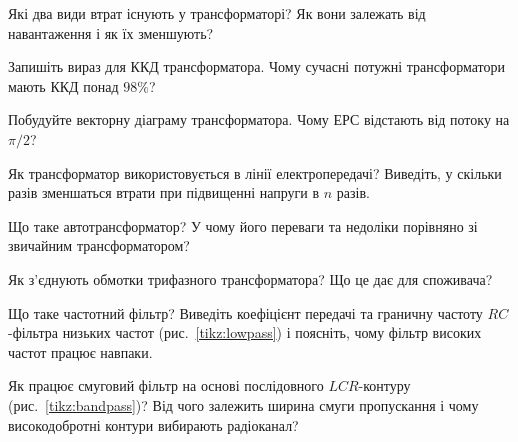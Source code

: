 \begin{Questions}
\begin{quizlist}
	\item Які два види втрат існують у трансформаторі? Як вони залежать від навантаження і як їх зменшують?
	\item Запишіть вираз для ККД трансформатора. Чому сучасні потужні трансформатори мають ККД понад $98\%$?
	\item Побудуйте векторну діаграму трансформатора. Чому ЕРС відстають від потоку на $\pi/2$?
	\item Як трансформатор використовується в лінії електропередачі? Виведіть, у скільки разів зменшаться втрати при підвищенні напруги в $n$ разів.
	\item Що таке автотрансформатор? У чому його переваги та недоліки порівняно зі звичайним трансформатором?
	\item Як з'єднують обмотки трифазного трансформатора? Що це дає для споживача?
	\item Що таке частотний фільтр? Виведіть коефіцієнт передачі та граничну частоту $RC$-фільтра низьких частот (рис.~\ref{tikz:lowpass}) і поясніть, чому фільтр високих частот працює навпаки.
	\item Як працює смуговий фільтр на основі послідовного $LCR$-контуру (рис.~\ref{tikz:bandpass})? Від чого залежить ширина смуги пропускання і чому високодобротні контури вибирають радіоканал?
\end{quizlist}
\end{Questions}